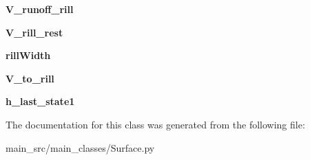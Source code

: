 \begin{DoxyCompactItemize}
\item 
\hypertarget{classmain__src_1_1main__classes_1_1Surface_1_1SurArrs_ac6b534a7fbc22fc4e5232159c42ec952}{{\bfseries V\-\_\-runoff\-\_\-rill}}\label{classmain__src_1_1main__classes_1_1Surface_1_1SurArrs_ac6b534a7fbc22fc4e5232159c42ec952}

\item 
\hypertarget{classmain__src_1_1main__classes_1_1Surface_1_1SurArrs_aae4fdd8e7f9c064e193de78c2a0fbf0a}{{\bfseries V\-\_\-rill\-\_\-rest}}\label{classmain__src_1_1main__classes_1_1Surface_1_1SurArrs_aae4fdd8e7f9c064e193de78c2a0fbf0a}

\item 
\hypertarget{classmain__src_1_1main__classes_1_1Surface_1_1SurArrs_a7f439f379abdb589c70a270f0f073b07}{{\bfseries rill\-Width}}\label{classmain__src_1_1main__classes_1_1Surface_1_1SurArrs_a7f439f379abdb589c70a270f0f073b07}

\item 
\hypertarget{classmain__src_1_1main__classes_1_1Surface_1_1SurArrs_ad3f60d42ceaeca96c7ae6b5434dfe2ef}{{\bfseries V\-\_\-to\-\_\-rill}}\label{classmain__src_1_1main__classes_1_1Surface_1_1SurArrs_ad3f60d42ceaeca96c7ae6b5434dfe2ef}

\item 
\hypertarget{classmain__src_1_1main__classes_1_1Surface_1_1SurArrs_a5002c728f20805b62b66fd1ed3a796a5}{{\bfseries h\-\_\-last\-\_\-state1}}\label{classmain__src_1_1main__classes_1_1Surface_1_1SurArrs_a5002c728f20805b62b66fd1ed3a796a5}

\end{DoxyCompactItemize}


The documentation for this class was generated from the following file\-:\begin{DoxyCompactItemize}
\item 
main\-\_\-src/main\-\_\-classes/Surface.\-py\end{DoxyCompactItemize}
